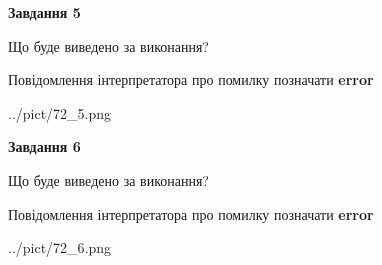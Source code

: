 \documentclass[12pt, ukrainian]{article}
\begin{document}
{{\begin {center}\textbf{Завдання 5}\end {center}}\par
Що буде виведено за виконання? \par
Повідомлення інтерпретатора про помилку позначати \textbf{error}

\begin{center}
	{../pict/72_5.png}
\end{center}
\newpage

{\begin {center}\textbf{Завдання 6}\end {center}}\par
Що буде виведено за виконання? \par
Повідомлення інтерпретатора про помилку позначати \textbf{error}

\begin{center}
	{../pict/72_6.png}
\end{center}
\newpage

}
\end{document}

